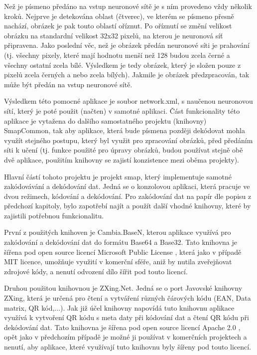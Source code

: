 \documentclass[conference]{IEEEtran}
\begin{document}
Než je písmeno předáno na vstup neuronové sítě je s ním provedeno vždy několik kroků. Nejprve je detekována oblast (čtverec), ve kterém se písmeno přesně nachází, obrázek je pak touto oblastí oříznut. Po oříznutí se změní velikost obrázku na standardní velikost 32x32 pixelů, na kterou je neuronová síť připravena. Jako poslední věc, než je obrázek předán neuronové síti je prahování (tj. všechny pixely, které mají hodnotu menší než 128 budou zcela černé a všechny ostatní zcela bílé. Výsledkem je tedy obrázek, který je složen pouze z pixelů zcela černých a nebo zcela bílých). Jakmile je obrázek předzpracován, tak může být předán na vstup neuronové sítě. 

Výsledkem této pomocné aplikace je soubor network.xml, s naučenou neuronovou sítí, který je poté použit (načten) v samotné aplikaci. Část funkcionality této aplikace je vytažena do dalšího samostatného projektu (knihovny) SmapCommon, tak aby aplikace, která bude písmena později dekódovat mohla využít stejného postupu, který byl využit pro zpracování obrázků, před předáním síti k učení (tj. funkce použité pro úpravy obrázků, budou používat stejně obě dvě aplikace, použitím knihovny se zajistí konzistence mezi oběma projekty).

Hlavní částí tohoto projektu je projekt smap, který implementuje samotné zakódovávání a dekódování dat. Jedná se o konzolovou aplikaci, která pracuje ve dvou režimech, kódování a dekódování. Pro zakódování dat na papír dle popisu z předchozí kapitoly, bylo zapotřebí najít a použít další vhodné knihovny, které by zajistili potřebnou funkcionalitu.

První z použitých knihoven je Cambia.BaseN, kterou aplikace využívá pro zakódování a dekódování dat do formátu Base64 a Base32. Tato knihovna je šířena pod open source licencí Microsoft Public License \cite{MicrosoftPublicLicense}, která jako v případě MIT licence, umožňuje využití v komerční sféře, aniž by nutila zveřejňovat zdrojové kódy, a nenutí odvození dílo šířit pod touto licencí.

Druhou použitou knihovnou je ZXing.Net. Jedná se o port Javovské knihovny ZXing, která je určená pro čtení a vytváření různých čárových kódu (EAN, Data matrix, QR kód,...). Jak již účel knihovny napovídá tuto knihovnu aplikace využívá k vytvoření QR kódu s meta daty při kódování dat a čtení QR kódu při dekódování dat. Tato knihovna je šířena pod open source licencí Apache 2.0 \cite{ApacheLicense}, opět jako v předchozím případě je možné ji používat v komerčních projektech a nenutí, aby aplikace, které využívají tuto knihovnu byly šířeny pod touto licencí.
\end{document}
